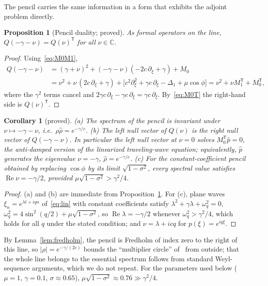 \documentclass[11pt]{article}
\theoremstyle{plain}
\newtheorem{proposition}[theorem]{Proposition}
\newtheorem{corollary}[theorem]{Corollary}
\theoremstyle{definition}
\theoremstyle{remark}
\newcommand{\ph}{\hat p}
\newcommand{\T}{\mathsf T}
\newcommand{\tagP}{\textsf{proved}}
\begin{document}
The pencil carries the same information in a form that exhibits the adjoint problem
directly.

\begin{proposition}[Pencil duality; \tagP]\label{prop:duality}
As formal operators on the line, $Q(-\gamma-\nu)=Q(\nu)^{\T}$ for all $\nu\in\mathbb C$.
\end{proposition}

\begin{proof}
Using~\eqref{eq:M0M1},
\begin{align*}
Q(-\gamma-\nu)
&=(\gamma+\nu)^2+(-\gamma-\nu)(-2c\,\partial_\xi+\gamma)+M_0\\
&=\nu^2+\nu\,(2c\,\partial_\xi+\gamma)
 +\bigl[c^2\partial_\xi^2+\gamma c\,\partial_\xi-\Delta_1+\mu\cos\phi\bigr]
 =\nu^2+\nu M_1^{\T}+M_0^{\T},
\end{align*}
where the $\gamma^2$ terms cancel and $2\gamma c\,\partial_\xi-\gamma c\,\partial_\xi=\gamma c\,\partial_\xi$.
By~\eqref{eq:M0T} the right-hand side is $Q(\nu)^{\T}$.
\end{proof}

\begin{corollary}[\tagP]\label{cor:duality}
(a) The spectrum of the pencil is invariant under $\nu\mapsto-\gamma-\nu$, i.e.\
$\rho\hat\rho=e^{-\gamma/c}$. (b) The left null vector of $Q(\nu)$ is the right null vector of
$Q(-\gamma-\nu)$. In particular the left null vector at $\nu=0$ solves $M_0^{\T}\ph=0$, the
anti-damped version of the linearized traveling-wave equation; equivalently, $\ph$
generates the eigenvalue $\nu=-\gamma$, $\hat\rho=e^{-\gamma/c}$. (c) For the
constant-coefficient pencil obtained by replacing $\cos\phi$ by its limit
$\sqrt{1-\sigma^2}$, every spectral value satisfies $\operatorname{Re}\nu=-\gamma/2$, provided
$\mu\sqrt{1-\sigma^2}>\gamma^2/4$.
\end{corollary}

\begin{proof}
(a) and (b) are immediate from Proposition~\ref{prop:duality}. For (c), plane waves
$\xi_n=e^{\lambda t+iqn}$ of~\eqref{eq:lin} with constant coefficients satisfy
$\lambda^2+\gamma\lambda+\omega_q^2=0$, $\omega_q^2=4\sin^2(q/2)+\mu\sqrt{1-\sigma^2}$, so
$\operatorname{Re}\lambda=-\gamma/2$ whenever $\omega_q^2>\gamma^2/4$, which holds for all $q$
under the stated condition; and $\nu=\lambda+icq$ for $p(\xi)=e^{iq\xi}$.
\end{proof}

By Lemma~\ref{lem:fredholm}, the pencil is Fredholm of index zero to the right of
this line, so $|\rho|=e^{-\gamma/(2c)}$ bounds the ``multiplier circle'' of~\cite{VCKX20}
from outside; that the whole line belongs to the essential spectrum follows from standard
Weyl-sequence arguments, which we do not repeat. For the parameters used below
($\mu=1$, $\gamma=0.1$, $\sigma\approx0.65$), $\mu\sqrt{1-\sigma^2}\approx0.76\gg\gamma^2/4$.
\end{document}
